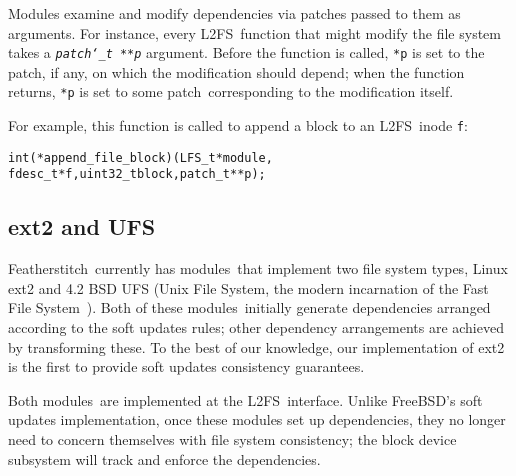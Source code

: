 \documentclass[9pt,twocolumn,letterpaper]{article}
\newcommand{\command}[1]{\emph{#1}}
\newcommand{\Kudos}{Featherstitch}
\newcommand{\patch}{patch}
\newcommand{\patches}{patches}
\newcommand{\module}{module}
\newcommand{\modules}{modules}
\newcommand{\Noop}{Empty}
\newcommand{\LFS}{L2FS}
\begin{document}
Modules examine and modify dependencies via patches passed to them as
arguments.
%
For instance, every \LFS\ function that might modify the file system takes a
\texttt{\textit{patch\char`\_t **p}} argument.
%
Before the function is called, \texttt{*p} is set to the \patch,
if any, on which the modification should depend;
%
when the function returns, \texttt{*p} is set to some \patch\
corresponding to the modification itself.
%
\begin{comment}
(\Noop\ \patches\ allow this interface to generalize to multiple
dependencies.)
\end{comment}
%
For example, this function is called to append a block to an \LFS\ inode
\verb+f+:

\vspace{-0.5\baselineskip}
\begin{small}
\begin{alltt}
int (*append_file_block)(LFS_t *module, 
   fdesc_t *f, uint32_t block, patch_t **p);
\end{alltt}
\end{small}
\vspace{-0.5\baselineskip}

\begin{comment}
\noindent
This design lets \LFS\ modules examine and modify the dependency structure.
\end{comment}



\subsection{ext2 and UFS}

\Kudos\ currently has \modules\ that implement two file system types, Linux
ext2 and 4.2 BSD UFS (Unix File System, the modern incarnation of the Fast File
System~\cite{mckusick84fast}).
%
Both of these \modules\ initially generate dependencies arranged according to the
soft updates rules; other dependency arrangements are achieved by transforming these.
To the best of our knowledge, our implementation of ext2 is the first to provide
soft updates consistency guarantees.
%

Both \modules\ are implemented at the \LFS\ interface. 
%
%
%
%
Unlike FreeBSD's soft updates implementation, once these modules set up 
dependencies, they no longer need to concern themselves with file system
consistency; the block device subsystem will track
and enforce the dependencies.
\end{document}
